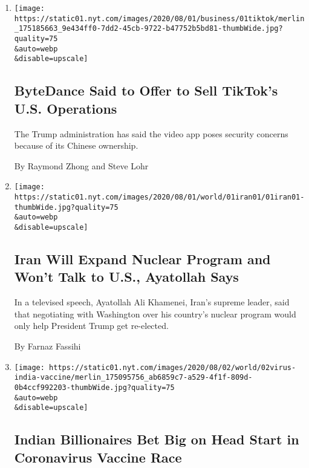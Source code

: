 \begin{enumerate}
\def\labelenumi{\arabic{enumi}.}
\item
  \href{/2020/08/01/technology/tiktok-sale-trump-ban.html}{}

  \texttt{[image: https://static01.nyt.com/images/2020/08/01/business/01tiktok/merlin\_175185663\_9e434ff0-7dd2-45cb-9722-b47752b5bd81-thumbWide.jpg?quality=75\\\&auto=webp\\\&disable=upscale]}

  \hypertarget{bytedance-said-to-offer-to-sell-tiktoks-us-operations}{%
  \subsection{ByteDance Said to Offer to Sell TikTok's U.S.
  Operations}\label{bytedance-said-to-offer-to-sell-tiktoks-us-operations}}

  The Trump administration has said the video app poses security
  concerns because of its Chinese ownership.

  By Raymond Zhong and Steve Lohr
\item
  \href{/2020/08/01/world/asia/iran-khamenei-us-sanctions.html}{}

  \texttt{[image: https://static01.nyt.com/images/2020/08/01/world/01iran01/01iran01-thumbWide.jpg?quality=75\\\&auto=webp\\\&disable=upscale]}

  \hypertarget{iran-will-expand-nuclear-program-and-wont-talk-to-us-ayatollah-says}{%
  \subsection{Iran Will Expand Nuclear Program and Won't Talk to U.S.,
  Ayatollah
  Says}\label{iran-will-expand-nuclear-program-and-wont-talk-to-us-ayatollah-says}}

  In a televised speech, Ayatollah Ali Khamenei, Iran's supreme leader,
  said that negotiating with Washington over his country's nuclear
  program would only help President Trump get re-elected.

  By Farnaz Fassihi
\item
  \href{/2020/08/01/world/asia/coronavirus-vaccine-india.html}{}

  \texttt{[image: https://static01.nyt.com/images/2020/08/02/world/02virus-india-vaccine/merlin\_175095756\_ab6859c7-a529-4f1f-809d-0b4ccf992203-thumbWide.jpg?quality=75\\\&auto=webp\\\&disable=upscale]}

  \hypertarget{indian-billionaires-bet-big-on-head-start-in-coronavirus-vaccine-race}{%
  \subsection{Indian Billionaires Bet Big on Head Start in Coronavirus
  Vaccine
  Race}\label{indian-billionaires-bet-big-on-head-start-in-coronavirus-vaccine-race}}


\end{enumerate}
